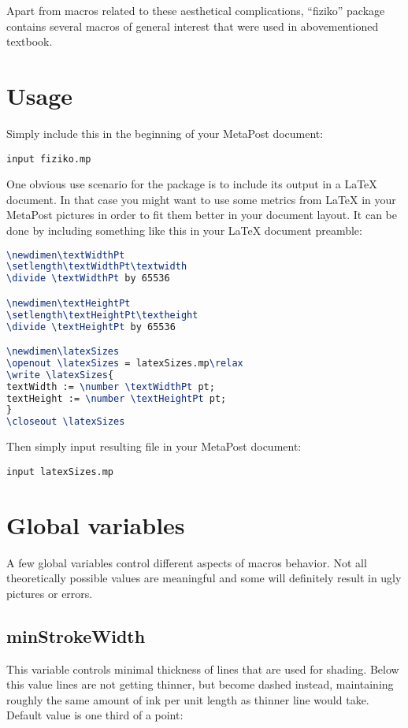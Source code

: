 \documentclass{article}
\begin{document}
\begin{empfile}
Apart from macros related to these aesthetical complications, ``fiziko'' package contains several macros of general interest that were used in abovementioned textbook.

\section{Usage}
Simply include this in the beginning of your MetaPost document:

\begin{lstlisting}
input fiziko.mp
\end{lstlisting}

One obvious use scenario for the package is to include its output in a LaTeX document. In that case you might want to use some metrics from LaTeX in your MetaPost pictures in order to fit them better in your document layout. It can be done by including something like this in your LaTeX document preamble:

\begin{lstlisting}[language=TeX]
\newdimen\textWidthPt
\setlength\textWidthPt\textwidth
\divide \textWidthPt by 65536

\newdimen\textHeightPt
\setlength\textHeightPt\textheight
\divide \textHeightPt by 65536

\newdimen\latexSizes
\openout \latexSizes = latexSizes.mp\relax
\write \latexSizes{
textWidth := \number \textWidthPt pt;
textHeight := \number \textHeightPt pt;
}
\closeout \latexSizes
\end{lstlisting}

Then simply input resulting file in your MetaPost document:

\begin{lstlisting}
input latexSizes.mp
\end{lstlisting}


\section{Global variables}
A few global variables control different aspects of macros behavior. Not all theoretically possible values are meaningful and some will definitely result in ugly pictures or errors.

\subsection{minStrokeWidth}
This variable controls minimal thickness of lines that are used for shading. Below this value lines are not getting thinner, but become dashed instead, maintaining roughly the same amount of ink per unit length as thinner line would take. Default value is one third of a point:


\end{empfile}
\end{document}
